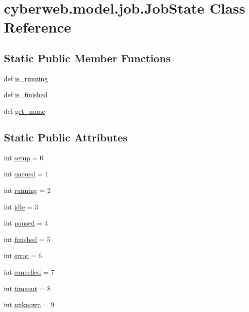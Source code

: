 \hypertarget{classcyberweb_1_1model_1_1job_1_1_job_state}{\section{cyberweb.\-model.\-job.\-Job\-State \-Class \-Reference}
\label{classcyberweb_1_1model_1_1job_1_1_job_state}
}
\subsection*{\-Static \-Public \-Member \-Functions}
\begin{DoxyCompactItemize}
\item 
def \hyperlink{classcyberweb_1_1model_1_1job_1_1_job_state_ab949a90e8326c433174a9c9166ac3365}{is\-\_\-running}
\item 
def \hyperlink{classcyberweb_1_1model_1_1job_1_1_job_state_aff11102607ee624114a138d3a72ec9fc}{is\-\_\-finished}
\item 
def \hyperlink{classcyberweb_1_1model_1_1job_1_1_job_state_aad13bdb60a071abe6e1100548f5e2197}{get\-\_\-name}
\end{DoxyCompactItemize}
\subsection*{\-Static \-Public \-Attributes}
\begin{DoxyCompactItemize}
\item 
int \hyperlink{classcyberweb_1_1model_1_1job_1_1_job_state_af39956899e03f4e09b14434134731575}{setup} = 0
\item 
int \hyperlink{classcyberweb_1_1model_1_1job_1_1_job_state_a89eada1579aae3a42b104df63c2cf0a6}{queued} = 1
\item 
int \hyperlink{classcyberweb_1_1model_1_1job_1_1_job_state_a35c9960b2fc6b06fae271d02f08f7062}{running} = 2
\item 
int \hyperlink{classcyberweb_1_1model_1_1job_1_1_job_state_a72866254fb185705cdd999f1df9f7180}{idle} = 3
\item 
int \hyperlink{classcyberweb_1_1model_1_1job_1_1_job_state_a59c2df6a40ebe49a36334f9daf58a427}{paused} = 4
\item 
int \hyperlink{classcyberweb_1_1model_1_1job_1_1_job_state_a9ce9d86cf142de99d008627b83a543c0}{finished} = 5
\item 
int \hyperlink{classcyberweb_1_1model_1_1job_1_1_job_state_ab5e250a5410927b329a92559d14fd286}{error} = 6
\item 
int \hyperlink{classcyberweb_1_1model_1_1job_1_1_job_state_a0eab2e3c37b800c85dfb0ff29b36c645}{cancelled} = 7
\item 
int \hyperlink{classcyberweb_1_1model_1_1job_1_1_job_state_a6e862b9c9ceee39cf1d0f1b5e4f8dd2d}{timeout} = 8
\item 
int \hyperlink{classcyberweb_1_1model_1_1job_1_1_job_state_a19ed7a205d8e561f1dad0ea257145dd0}{unknown} = 9
\end{DoxyCompactItemize}



